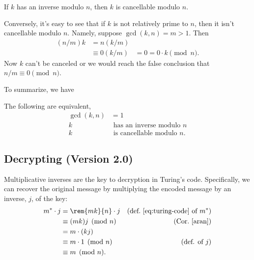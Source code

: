 \begin{lemma}\label{lem:cancellation-arb}
If $k$ has an inverse modulo $n$, then $k$ is cancellable modulo $n$.
\end{lemma}

\iffalse
\begin{proof}
In the left hand congruence, multiply both sides by an inverse $j$ of $k$ to obtain
\[
(ak)j \equiv (bk)j \pmod{n}.
\]
Since $kj \equiv 1 \pmod{n}$, this immediately simplifies to $a \equiv
b \pmod{n}$.
\end{proof}
\fi

Conversely, it's easy to see that if $k$ is not relatively prime to
$n$, then it isn't cancellable modulo $n$.  Namely, suppose $\gcd(k,n)
= m >1$.  Then
\begin{align*}
(n/m)k & = n (k/m)\\
       & \equiv 0 (k/m)
       & = 0 = 0 \cdot k \pmod n.
\end{align*}
Now $k$ can't be canceled or we would reach the false conclusion
that $n/m \equiv 0 \pmod n$.

To summarize, we have
\begin{theorem}\label{thm:mod_inverses}
The following are equivalent,
\begin{align}
\gcd(k, n)& = 1\\
k & \text{ has an inverse modulo } n\\
k & \text{ is cancellable modulo } n.
\end{align}
\end{theorem}

\subsection{Decrypting (Version 2.0)}

Multiplicative inverses are the key to decryption in Turing's code.  Specifically, we can
recover the original message by multiplying the encoded message by an inverse, $j$, of
the key:
\begin{align*}
m^* \cdot j
  & = \rem{mk}{n} \cdot j & \text{(def.~\eqref{eq:turing-code} of $m^*$)}\\
  & \equiv (mk)j \pmod{n} & \text{(Cor.~\ref{aran})}\\
  & = m \cdot (kj)\\
  & \equiv m \cdot 1 \pmod{n} & \text{(def. of $j$)}\\
  & \equiv m \pmod{n}.
\end{align*}

